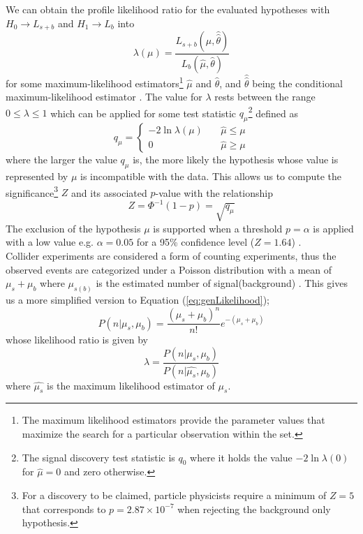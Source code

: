 We can obtain the profile likelihood ratio for the evaluated hypotheses with $H_0 \rightarrow L_{s+b}$ and $H_1 \rightarrow L_b$ into
\begin{equation}
    \lambda(\mu) = \frac{L_{s+b}(\mu, \hat{\hat{\theta}})}{L_b(\hat{\mu},\hat{\theta})}
    \label{eq:genLR}
\end{equation}
for some maximum-likelihood estimators\footnote{The maximum likelihood estimators provide the parameter values that maximize the search for a particular observation within the set.} $\hat{\mu}$ and $\hat{\theta}$, and $\hat{\hat{\theta}}$ being the conditional maximum-likelihood estimator \cite{cowan2011asymptotic}. The value for $\lambda$ rests between the range $0 \leq \lambda \leq 1$ which can be applied for some test statistic $q_\mu$\footnote{The signal discovery test statistic is $q_0$ where it holds the value $-2 \ln \lambda (0)$ for $\hat{\mu}=0$ and zero otherwise.} defined as
\begin{equation}
    q_\mu = \left\{
        \begin{array}{ll}
            -2\ln \lambda(\mu) & \quad \hat{\mu} \leq \mu \\
            0 & \quad \hat{\mu} \geq \mu
        \end{array}
    \right.
\end{equation}
where the larger the value $q_\mu$ is, the more likely the hypothesis whose value is represented by $\mu$ is incompatible with the data. This allows us to compute the significance\footnote{For a discovery to be claimed, particle physicists require a minimum of $Z=5$ that corresponds to $p=2.87\times10^{-7}$ when rejecting the background only hypothesis.} $Z$ and its associated $p$-value with the relationship
\begin{equation}
    Z = \Phi^{-1}(1-p) = \sqrt{q_\mu}
    \label{eq:Z}
\end{equation}
The exclusion of the hypothesis $\mu$ is supported when a threshold $p=\alpha$ is applied with a low value e.g. $\alpha=0.05$ for a 95\% confidence level ($Z=1.64$) \cite{cowan2011asymptotic}. \\

Collider experiments are considered a form of counting experiments, thus the observed events are categorized under a Poisson distribution with a mean of $\mu_s+\mu_b$ where $\mu_{s(b)}$ is the estimated number of signal(background) \cite{lista2017statistical, adam-bourdarios_learning_2014}. This gives us a more simplified version to Equation (\ref{eq:genLikelihood});
\begin{equation}
    P(n|\mu_s,\mu_b) = \frac{(\mu_s+\mu_b)^n}{n!}e^{-(\mu_s+\mu_b)}
    \label{eq:Poisson}
\end{equation}
whose likelihood ratio is given by
\begin{equation}
    \lambda = \frac{P(n|\mu_s,\mu_b)}{P(n|\hat{\mu_s},\mu_b)}
    \label{eq:likelihoodRatio}
\end{equation}
where $\hat{\mu_s}$ is the maximum likelihood estimator of $\mu_s$. \\


